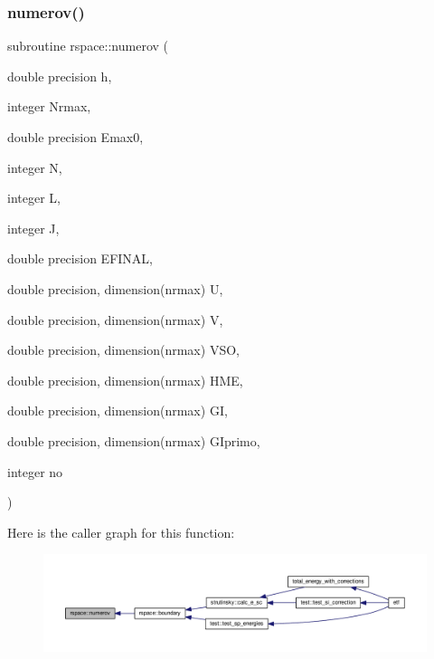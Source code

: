 \subsubsection{\texorpdfstring{numerov()}{numerov()}}
{\footnotesize\ttfamily subroutine rspace\+::numerov (\begin{DoxyParamCaption}\item[{double precision}]{h,  }\item[{integer}]{Nrmax,  }\item[{double precision}]{Emax0,  }\item[{integer}]{N,  }\item[{integer}]{L,  }\item[{integer}]{J,  }\item[{double precision}]{E\+F\+I\+N\+AL,  }\item[{double precision, dimension(nrmax)}]{U,  }\item[{double precision, dimension(nrmax)}]{V,  }\item[{double precision, dimension(nrmax)}]{V\+SO,  }\item[{double precision, dimension(nrmax)}]{H\+ME,  }\item[{double precision, dimension(nrmax)}]{GI,  }\item[{double precision, dimension(nrmax)}]{G\+Iprimo,  }\item[{integer}]{no }\end{DoxyParamCaption})}

Here is the caller graph for this function\+:
\nopagebreak
\begin{figure}[H]
\begin{center}
\leavevmode
\includegraphics[width=350pt]{namespacerspace_a95f8e6b75776b923eb4ab9cc71a3be33_icgraph}
\end{center}
\end{figure}
